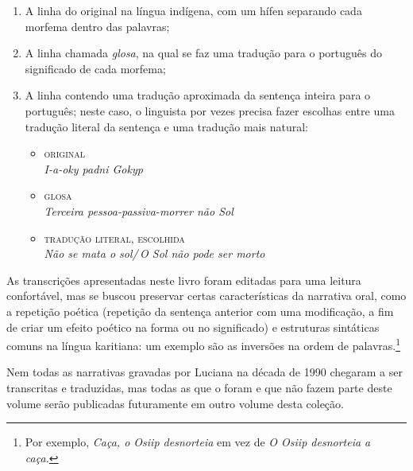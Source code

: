\begin{enumerate}
\item A linha do original na língua indígena, com um hífen
separando cada morfema dentro das palavras; 

\item A linha chamada
\textit{glosa}, na qual se faz uma tradução para o português do
significado de cada morfema;

\item A linha contendo uma tradução
aproximada da sentença inteira para o português; neste caso, o linguista
por vezes precisa fazer escolhas entre uma tradução literal da sentença
e uma tradução mais natural:


\begin{itemize}
\item \textsc{original}\\
	\textit{I-a-oky padni Gokyp}
\item \textsc{glosa}\\
	\textit{Terceira pessoa-passiva-morrer não Sol}
\item \textsc{tradução literal, escolhida}\\
	\textit{Não se mata o sol/\,O Sol não pode ser morto}
\end{itemize}

\end{enumerate}

As transcrições apresentadas neste livro foram editadas para uma leitura
confortável, mas se buscou preservar certas características da narrativa
oral, como a repetição poética (repetição da sentença anterior com uma
modificação, a fim de criar um efeito poético na forma ou no
significado) e estruturas sintáticas comuns na língua karitiana: um
exemplo são as inversões na ordem de palavras.\footnote{Por exemplo, \textit{Caça, o
Osiip desnorteia} em vez de \textit{O Osiip desnorteia a caça.}}

Nem todas as narrativas gravadas por Luciana na década de 1990 chegaram
a ser transcritas e traduzidas, mas todas as que o foram e que não fazem
parte deste volume serão publicadas futuramente em outro volume desta
coleção.
